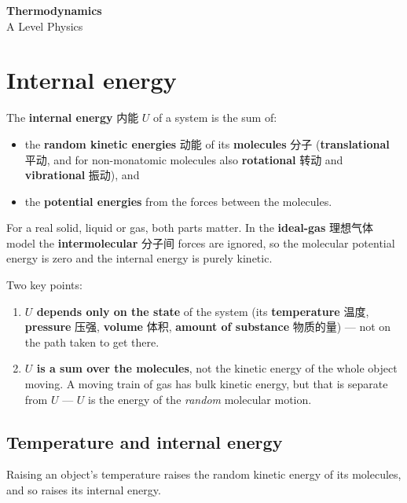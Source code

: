 \documentclass[11pt]{article}
\begin{document}
\begin{center}
  {\LARGE\bfseries Thermodynamics}\\[0.35em]
  {\large A Level Physics}
\end{center}
\vspace{0.6em}

\section*{Internal energy}

The \textbf{internal energy} 内能 $U$ of a system is the sum of:

\begin{itemize}
\item the \textbf{random kinetic energies} 动能 of its \textbf{molecules} 分子 (\textbf{translational} 平动, and for non-monatomic molecules also \textbf{rotational} 转动 and \textbf{vibrational} 振动), and

\item the \textbf{potential energies} from the forces between the molecules.

\end{itemize}

For a real solid, liquid or gas, both parts matter. In the \textbf{ideal-gas} 理想气体 model the \textbf{intermolecular} 分子间 forces are ignored, so the molecular potential energy is zero and the internal energy is purely kinetic.

Two key points:

\begin{enumerate}
\item \textbf{$U$ depends only on the state} of the system (its \textbf{temperature} 温度, \textbf{pressure} 压强, \textbf{volume} 体积, \textbf{amount of substance} 物质的量) — not on the path taken to get there.

\item \textbf{$U$ is a sum over the molecules}, not the kinetic energy of the whole object moving. A moving train of gas has bulk kinetic energy, but that is separate from $U$ — $U$ is the energy of the \emph{random} molecular motion.

\end{enumerate}

\subsection*{Temperature and internal energy}

Raising an object's temperature raises the random kinetic energy of its molecules, and so raises its internal energy.
\end{document}
